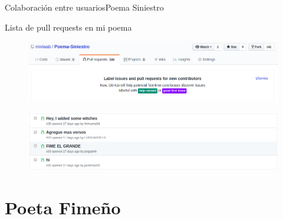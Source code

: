 \documentclass[10pt]{beamer}
\begin{document}
\begin{frame}{Colaboración entre usuarios}{Poema Siniestro}

\begin{block}{Lista de pull requests en mi poema}

\begin{figure}[h!]
\centering
\includegraphics [scale=0.27]{step2}
\label{fig:step2}
\end{figure}
\vspace{-0.2in}
\begin{figure}[h!]
  \centering
  \includegraphics [scale=0.27]{step2_1}
  \label{fig:step2_1}
\end{figure}

\end{block}

\end{frame}

\section{Poeta Fimeño}
\end{document}
